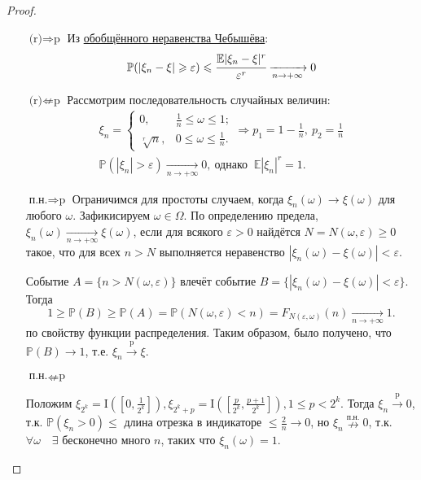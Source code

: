 \begin{proof}
    \begin{itemize}
        \item[$\text{(r)} \Rightarrow \text{p}$] Из \hyperlink{cheb}{обобщённого неравенства Чебышёва}:
    \begin{equation*}
        \mathbb{P}(|\xi_n - \xi| \geqslant \varepsilon) \leqslant \cfrac{\mathbb{E}|\xi_n - \xi|^{r}}{\varepsilon^{r}} \xrightarrow[n \to +\infty]{} 0
    \end{equation*}
    
    \item[$\text{(r)} \nLeftarrow \text{p}$] Рассмотрим последовательность случайных величин:
    \begin{gather*}
        \xi_n = 
        \begin{cases}
            0, & \frac{1}{n} \leqslant \omega \leqslant 1; \\
            \sqrt[r]{n}, & 0 \leqslant \omega \leqslant \frac{1}{n}.
        \end{cases}
        \Rightarrow p_1 = 1 - \frac{1}{n},~ p_2 = \frac{1}{n} \\
        \mathbb{P}(|\xi_n| > \varepsilon) \xrightarrow[n \to +\infty]{} 0,~ \text{однако $~\mathbb{E}|\xi_n|^{r} = 1$}.
    \end{gather*}
    
    \item[$\text{п.н.} \Rightarrow \text{p}$]
    Ограничимся для простоты случаем, когда $\xi_n(\omega) \rightarrow \xi(\omega)$ для любого $\omega$. Зафикисируем $\omega \in \Omega.$ По определению предела, $\xi_n(\omega) \xrightarrow[n \to +\infty]{} \xi(\omega)$, если для всякого $\varepsilon > 0$ найдётся $N = N(\omega, \varepsilon) \geqslant 0$ такое, что для всех $n > N$ выполняется неравенство $|\xi_n(\omega) - \xi(\omega)| < \varepsilon$.
    
    Событие $A = \{n > N(\omega,\varepsilon) \}$ влечёт событие $B = \{|\xi_n(\omega) - \xi(\omega)| < \varepsilon \}$. Тогда 
    $$1 \geqslant \mathbb{P}(B) \geqslant \mathbb{P}(A)=\mathbb{P}(N(\omega, \varepsilon)<n)=F_{N(\varepsilon, \omega)}(n) \xrightarrow[n \to +\infty]{} 1.$$ по свойству функции распределения. Таким образом, было получено, что $\mathbb{P}(B) \rightarrow 1$, т.е. $\xi_n \xrightarrow[]{\text{p}} \xi.$
    
    \item[$\text{п.н.} \nLeftarrow \text{p}$]
    
    Положим $\xi_{2^{k}}=\mathrm{I}\left(\left[0, \frac{1}{2^{k}}\right]\right), \xi_{2^{k}+p}=\mathrm{I}\left(\left[\frac{p}{2^{k}}, \frac{p+1}{2^{k}}\right]\right), 1 \leqslant p<2^{k}.$ Тогда $\xi_n \xrightarrow[]{\text{p}} 0$, т.к. $\mathbb{P}(\xi_n > 0) \leqslant$ длина отрезка в индикаторе $\leqslant \frac{2}{n} \rightarrow 0$, но $\xi_n \overset{\text{п.н.}}{\nrightarrow} 0$, т.к. $\forall \omega \quad \exists$ бесконечно много $n$, таких что $\xi_n(\omega) = 1.$
    

\end{itemize}
\end{proof}
